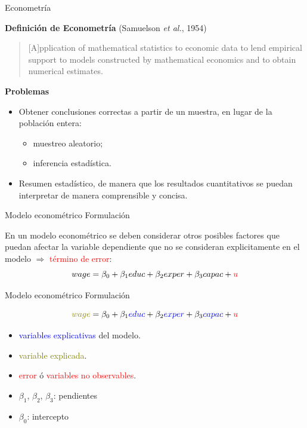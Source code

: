 \documentclass[11pt,handout]{beamer}
\begin{document}
\begin{frame}{Econometría} 

\textbf{Definición de Econometría} (Samuelson \textit{et al.}, 1954)
\begin{quotation}
	[A]pplication of mathematical statistics to economic data to lend 
empirical support to models constructed by mathematical economics 
and to obtain numerical estimates.
\end{quotation}

\pause \vspace{.125cm}
\textbf{Problemas} 
\pause 
\begin{itemize}[<+->]
	\item Obtener conclusiones correctas a partir de un muestra, en lugar de la población entera:
		\begin{itemize}[<+->]
			\item muestreo aleatorio;
			\item inferencia estadística.
		\end{itemize}
	\item Resumen estadístico, de manera que los resultados cuantitativos se puedan interpretar de manera comprensible y concisa.
\end{itemize}
\end{frame}

\begin{frame}{Modelo econométrico}
{Formulación}

En un modelo econométrico se deben considerar otros posibles factores que puedan afectar la variable dependiente que no se consideran explicitamente en el modelo
$\Rightarrow$ \textcolor{red}{término de error}:
\pause 
\[
	wage = \beta_0 + \beta_1 educ + \beta_2 exper + \beta_3 capac + \textcolor{red}{u}
\]
\end{frame}

\begin{frame}{Modelo econométrico}
{Formulación}

\[
	\textcolor{olive}{wage} = \beta_0 + \beta_1 \textcolor{blue}{educ} + \beta_2 \textcolor{blue}{exper} + \beta_3 \textcolor{blue}{capac} + \textcolor{red}{u}
\]
\begin{itemize}
	\item \textcolor{blue}{variables explicativas} del modelo.
	\item \textcolor{olive}{variable explicada}.
	\item \textcolor{red}{error} ó \textcolor{red}{variables no observables}.
	\item $\beta_1$,  $\beta_2$, $\beta_3$: pendientes
	\item $\beta_0$: intercepto
\end{itemize}


\end{frame}
\end{document}
